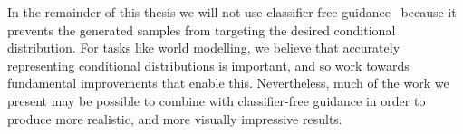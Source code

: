 In the remainder of this thesis we will not use classifier-free guidance~\citep{ho2022classifier} because it prevents the generated samples from targeting the desired conditional distribution. For tasks like world modelling, we believe that accurately representing conditional distributions is important, and so work towards fundamental improvements that enable this. Nevertheless, much of the work we present may be possible to combine with classifier-free guidance in order to produce more realistic, and more visually impressive results.
